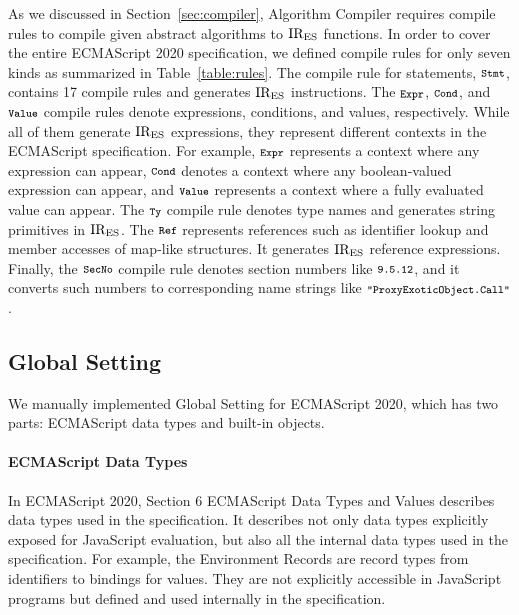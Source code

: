 As we discussed in Section~\ref{sec:compiler}, \textsf{Algorithm Compiler}
requires compile rules to compile given abstract algorithms to \( \text{IR}_\text{ES} \)
functions.  In order to cover the entire ECMAScript 2020 specification,
we defined compile rules for only seven kinds as summarized in
Table~\ref{table:rules}.  The compile rule for statements, \( \texttt{\footnotesize Stmt} \),
contains 17 compile rules and generates \( \text{IR}_\text{ES} \) instructions.
The \( \texttt{\footnotesize Expr} \), \( \texttt{\footnotesize Cond} \), and \( \texttt{\footnotesize Value} \) compile
rules denote expressions, conditions, and values, respectively.  While
all of them generate \( \text{IR}_\text{ES} \) expressions, they represent different
contexts in the ECMAScript specification.  For example,
\( \texttt{\footnotesize Expr} \) represents a context where any expression can appear,
\( \texttt{\footnotesize Cond} \) denotes a context where any boolean-valued expression
can appear, and \( \texttt{\footnotesize Value} \) represents a context where a fully
evaluated value can appear.  The \( \texttt{\footnotesize Ty} \) compile rule denotes
type names and generates string primitives in \( \text{IR}_\text{ES} \).  The \( \texttt{\footnotesize Ref} \)
represents references such as identifier lookup and member accesses of
map-like structures.  It generates \( \text{IR}_\text{ES} \) reference expressions.
Finally, the \( \texttt{\footnotesize SecNo} \) compile rule denotes section numbers
like \( \texttt{\footnotesize9.5.12} \), and it converts such numbers to
corresponding name strings like \( \texttt{\footnotesize"ProxyExoticObject.Call"} \).

\subsection{Global Setting}
We manually implemented \textsf{Global Setting} for ECMAScript 2020,
which has two parts: ECMAScript data types and built-in objects.

\paragraph{ECMAScript Data Types}
In ECMAScript 2020, Section 6 \textsf{ECMAScript Data Types and Values}
describes data types used in the specification.  It describes not only
data types explicitly exposed for JavaScript evaluation, but also all
the internal data types used in the specification.  For example, the
Environment Records are record types from identifiers to bindings for
values.  They are not explicitly accessible in JavaScript programs
but defined and used internally in the specification.

